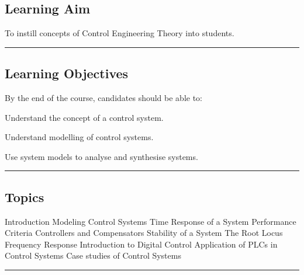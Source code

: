 \subsection*{Learning Aim}
To instill concepts of Control Engineering Theory into students.
\vspace{2ex} \hrule\vspace{2ex}

\subsection*{Learning Objectives}
By the end of the course, candidates should be able to:
\begin{outline}
    \1      Understand the concept of a control system.

    \1  	Understand modelling of control systems.

    \1  	Use system models to analyse and synthesise systems.

\end{outline}
\vspace{2ex}\hrule\vspace{2ex}

\subsection*{Topics}
\begin{outline}
    \1 Introduction
    \1 Modeling Control Systems
    \1 Time Response of a System
    \1 Performance Criteria
    \1 Controllers and Compensators
    \1 Stability of a System
    \1 The Root Locus
    \1 Frequency Response
    \1 Introduction to Digital Control
    \1 Application of PLCs in Control Systems
    \1 Case studies of Control Systems
\end{outline}
\vspace{2ex} \hrule\vspace{2ex}

